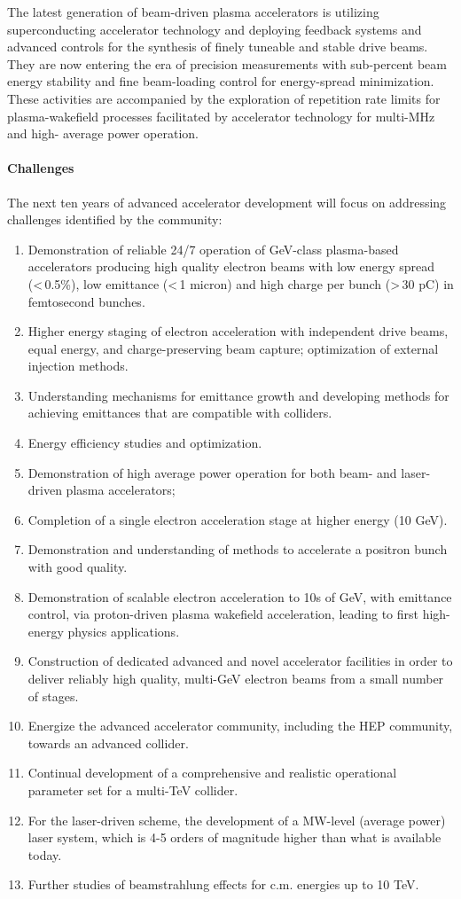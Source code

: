 The latest generation of beam-driven plasma accelerators is utilizing superconducting accelerator technology and deploying feedback systems and advanced controls for the synthesis of finely tuneable and stable drive beams. They are now entering the era of precision measurements with sub-percent beam energy stability and fine beam-loading control for energy-spread minimization.  These activities are accompanied by the exploration of repetition rate limits for plasma-wakefield processes facilitated by accelerator technology for multi-MHz and high- average power operation.

\paragraph*{Challenges}

The next ten years of advanced accelerator development will focus on addressing challenges identified by the community:
\begin{enumerate}
\item	
Demonstration of reliable 24/7 operation of GeV-class plasma-based accelerators producing high quality electron beams with low energy spread (<\,0.5\%), low emittance (<\,1 micron) and high charge per bunch (>\,30 pC) in femtosecond bunches.
\item	
Higher energy staging of electron acceleration with independent drive beams, equal energy, and charge-preserving beam capture; optimization of external injection methods.
\item	
Understanding mechanisms for emittance growth and developing methods for achieving emittances that are compatible with colliders.
\item Energy efficiency studies and optimization.
\item Demonstration of high average power operation for both beam- and laser-driven plasma accelerators;
\item Completion of a single electron acceleration stage at higher energy (10 GeV).
\item Demonstration and understanding of methods to accelerate a positron bunch with good quality.
\item Demonstration of scalable electron acceleration to 10s of GeV, with emittance control, via proton-driven plasma wakefield acceleration, leading to first high-energy physics applications.
\item Construction of dedicated advanced and novel accelerator facilities in order to deliver reliably high quality, multi-GeV electron beams from a small number of stages.
\item Energize the advanced accelerator community, including the HEP community, towards an advanced collider.
\item Continual development of a comprehensive and realistic operational parameter set for a multi-TeV collider.
\item For the laser-driven scheme, the development of a MW-level (average power) laser system, which is 4-5 orders of magnitude higher than what is available today.
\item Further studies of beamstrahlung effects for c.m. energies up to 10 TeV. 
\end{enumerate} 

